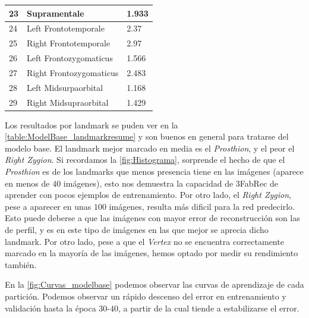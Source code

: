 \begin{table}[!ht]
\begin{tabular}{|l|l|l|}
                23 & Supramentale & 1.933 \\ \hline
                24 & Left Frontotemporale & 2.37 \\ \hline
                25 & Right Frontotemporale & 2.97 \\ \hline
                26 & Left Frontozygomaticus & 1.566 \\ \hline
                27 & Right Frontozygomaticus & 2.483 \\ \hline
                28 & Left Midsurpaorbital & 1.168 \\ \hline
                29 & Right Midsupraorbital & 1.429 \\ \hline
            \end{tabular}
            \label{table:ModelBase_landmarkresume}
        \end{table}
        \medskip

        \noindent Los resultados por landmark se puden ver en la \autoref{table:ModelBase_landmarkresume} y son buenos en general para tratarse del modelo base. El landmark mejor marcado en media es el \textit{Prosthion}, y el peor el \textit{Right Zygion}. Si recordamos la \autoref{fig:Histograma}, sorprende el hecho de que el \textit{Prosthion} es de los landmarks que menos presencia tiene en las imágenes (aparece en menos de $40$ imágenes), esto nos demuestra la capacidad de 3FabRec de aprender con pocos ejemplos de entrenamiento. Por otro lado, el \textit{Right Zygion}, pese a aparecer en unas $100$ imágenes, resulta más dificil para la red predecirlo. Esto puede deberse a que las imágenes con mayor error de reconstrucción son las de perfil, y es en este tipo de imágenes en las que mejor se aprecia dicho landmark. Por otro lado, pese a que el \textit{Vertex} no se encuentra correctamente marcado en la mayoría de las imágenes, hemos optado por medir su rendimiento también.

        \medskip

        \noindent En la \autoref{fig:Curvas_modelbase} podemos observar las curvas de aprendizaje de cada partición. Podemos observar un rápido descenso del error en entrenamiento y validación hasta la época $30$-$40$, a partir de la cual tiende a estabilizarse el error.

